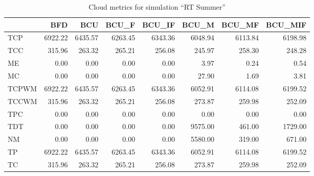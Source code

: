 \begin{table}[ht]
\centering
\begin{tabular}{lrrrrrrr}
\toprule
{} &      BFD &      BCU &    BCU\_F &   BCU\_IF &    BCU\_M &   BCU\_MF &  BCU\_MIF \\
\midrule
TCP   &  6922.22 &  6435.57 &  6263.45 &  6343.36 &  6048.94 &  6113.84 &  6198.98 \\
TCC   &   315.96 &   263.32 &   265.21 &   256.08 &   245.97 &   258.30 &   248.28 \\
ME    &     0.00 &     0.00 &     0.00 &     0.00 &     3.97 &     0.24 &     0.54 \\
MC    &     0.00 &     0.00 &     0.00 &     0.00 &    27.90 &     1.69 &     3.81 \\
TCPWM &  6922.22 &  6435.57 &  6263.45 &  6343.36 &  6052.91 &  6114.08 &  6199.52 \\
TCCWM &   315.96 &   263.32 &   265.21 &   256.08 &   273.87 &   259.98 &   252.09 \\
TPC   &     0.00 &     0.00 &     0.00 &     0.00 &     0.00 &     0.00 &     0.00 \\
TDT   &     0.00 &     0.00 &     0.00 &     0.00 &  9575.00 &   461.00 &  1729.00 \\
NM    &     0.00 &     0.00 &     0.00 &     0.00 &  5580.00 &   319.00 &   671.00 \\
TP    &  6922.22 &  6435.57 &  6263.45 &  6343.36 &  6052.91 &  6114.08 &  6199.52 \\
TC    &   315.96 &   263.32 &   265.21 &   256.08 &   273.87 &   259.98 &   252.09 \\
\bottomrule
\end{tabular}
\caption{Cloud metrics for simulation "`RT Summer"'}
\end{table}


